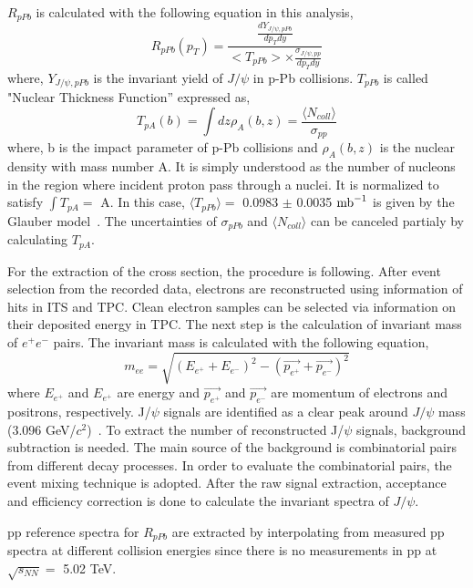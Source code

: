 $R_{pPb}$ is calculated with the following equation in this analysis, 
\begin{equation}
  R_{pPb} (p_{T}) = \frac{ \frac{ dY_{J/\psi , pPb} }{ dp_{T}dy } }{<T_{pPb}>\times \frac{\sigma_{J/\psi, pp}}{dp_{T}dy}}
\end{equation}
where, $Y_{J/\psi , pPb}$ is the invariant yield of $J/\psi$ in p-Pb collisions. 
$T_{pPb}$ is called "Nuclear Thickness Function'' expressed as, 
\begin{equation}
  T_{pA}(b) = \int{dz \rho_{A}(b,z)} = \frac{\langle N_{coll}\rangle }{\sigma_{pp}}
\end{equation}
 where, b is the impact parameter of p-Pb collisions and $\rho_{A}(b, z)$ is the nuclear density with mass number A.  
It is simply understood as the number of nucleons in the region where incident proton pass through a nuclei. 
It is normalized to satisfy $\int{T_{pA}} =$ A.
In this case, $\langle T_{pPb}\rangle =$ 0.0983 $\pm$ 0.0035 $\rm{mb}^{-1}$ is given by the Glauber model~\cite{bib_tppb}.
The uncertainties of $\sigma_{pPb}$ and $\langle N_{coll}\rangle$ can be canceled partialy by calculating ${T_{pA}}$.

For the extraction of the cross section, the procedure is following. 
After event selection from the recorded data, electrons are reconstructed using information of hits in ITS and TPC. 
Clean electron samples can be selected via information on their deposited energy in TPC. 
The next step is the calculation of invariant mass of $e^{+}e^{-}$ pairs. 
The invariant mass is calculated with the following equation, 
\begin{equation}
  m_{ee} = \sqrt{(E_{e^{+}}+E_{e^{-}})^{2}-(\vec{p_{e^{+}}} + \vec{p_{e^{-}}})^{2}}
\end{equation}
where $E_{e^{+}}$ and $E_{e^{+}}$ are energy and $\vec{p_{e^{+}}}$ and $\vec{p_{e^{-}}}$ are momentum of electrons and positrons, respectively.
J/$\psi$ signals are identified as a clear peak around $J/\psi$ mass (3.096 GeV/$c^{2}$)~\cite{bib_pdg}. 
To extract the number of reconstructed J/$\psi$ signals, background subtraction is needed. 
The main source of the background is combinatorial pairs from different decay processes. 
In order to evaluate the combinatorial pairs, the event mixing technique is adopted.  
After the raw signal extraction, acceptance and efficiency correction is done to calculate the invariant spectra of $J/\psi$.

pp reference spectra for $R_{pPb}$ are extracted by interpolating from measured pp spectra at different collision energies since there is no measurements in pp at $\sqrt{s_{NN}} = $ 5.02 TeV. 

